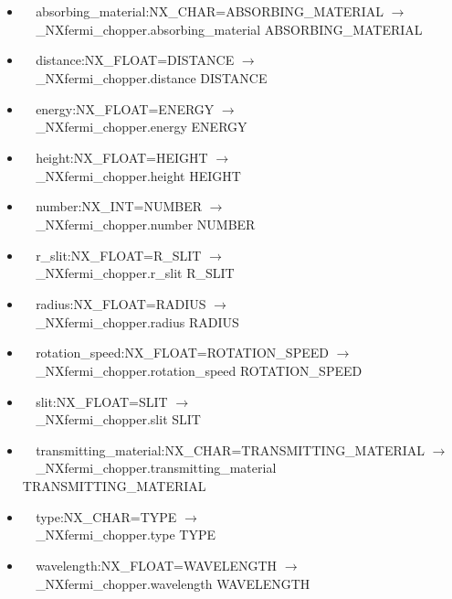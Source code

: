 \documentclass[11pt]{article}
\begin{document}
{{\begin{itemize}
\item{\verb|  |absorbing\_material:NX\_CHAR=ABSORBING\_MATERIAL $\rightarrow$\\
\verb|  |\_NXfermi\_chopper.absorbing\_material ABSORBING\_MATERIAL}

\item{\verb|  |distance:NX\_FLOAT=DISTANCE $\rightarrow$\\
\verb|  |\_NXfermi\_chopper.distance DISTANCE}

\item{\verb|  |energy:NX\_FLOAT=ENERGY $\rightarrow$\\
\verb|  |\_NXfermi\_chopper.energy ENERGY}

\item{\verb|  |height:NX\_FLOAT=HEIGHT $\rightarrow$\\
\verb|  |\_NXfermi\_chopper.height HEIGHT}

\item{\verb|  |number:NX\_INT=NUMBER $\rightarrow$\\
\verb|  |\_NXfermi\_chopper.number NUMBER}

\item{\verb|  |r\_slit:NX\_FLOAT=R\_SLIT $\rightarrow$\\
\verb|  |\_NXfermi\_chopper.r\_slit R\_SLIT}

\item{\verb|  |radius:NX\_FLOAT=RADIUS $\rightarrow$\\
\verb|  |\_NXfermi\_chopper.radius RADIUS}

\item{\verb|  |rotation\_speed:NX\_FLOAT=ROTATION\_SPEED $\rightarrow$\\
\verb|  |\_NXfermi\_chopper.rotation\_speed ROTATION\_SPEED}

\item{\verb|  |slit:NX\_FLOAT=SLIT $\rightarrow$\\
\verb|  |\_NXfermi\_chopper.slit SLIT}

\item{\verb|  |transmitting\_material:NX\_CHAR=TRANSMITTING\_MATERIAL $\rightarrow$\\
\verb|  |\_NXfermi\_chopper.transmitting\_material TRANSMITTING\_MATERIAL}

\item{\verb|  |type:NX\_CHAR=TYPE $\rightarrow$\\
\verb|  |\_NXfermi\_chopper.type TYPE}

\item{\verb|  |wavelength:NX\_FLOAT=WAVELENGTH $\rightarrow$\\
\verb|  |\_NXfermi\_chopper.wavelength WAVELENGTH}


\end{itemize}}}
\end{document}
